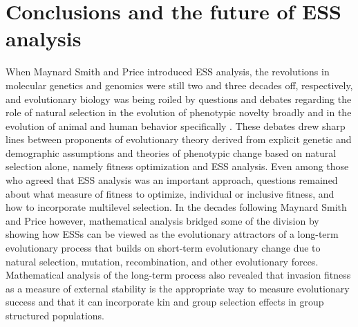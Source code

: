 \documentclass[11pt]{article}
\begin{document}
\section{Conclusions and the future of ESS analysis}

When Maynard Smith and Price \cite{Maynard-Smith:Price:1973,Maynard-Smith:1974} introduced ESS analysis, the revolutions in molecular genetics and genomics were still two and three decades off, respectively, and evolutionary biology was being roiled by questions and debates regarding the role of natural selection in the evolution of phenotypic novelty broadly \cite{Gould:Lewontin:1979} and in the evolution of animal and human behavior specifically \cite{Lewontin:1977,Hamilton:1977}. These debates drew sharp lines between proponents of evolutionary theory derived from explicit genetic and demographic assumptions and theories of phenotypic change based on natural selection alone, namely fitness optimization and ESS analysis. Even among those who agreed that ESS analysis was an important approach, questions remained about what measure of fitness to optimize, individual or inclusive fitness, and how to incorporate multilevel selection. In the decades following Maynard Smith and Price \cite{Maynard-Smith:Price:1973} however, mathematical analysis bridged some of the division by showing how ESSs can be viewed as the evolutionary attractors of a long-term evolutionary process that builds on short-term evolutionary change due to natural selection, mutation, recombination, and other evolutionary forces. Mathematical analysis of the long-term process also revealed that invasion fitness as a measure of external stability is the appropriate way to measure evolutionary success and that it can incorporate kin and group selection effects in group structured populations.
\end{document}
